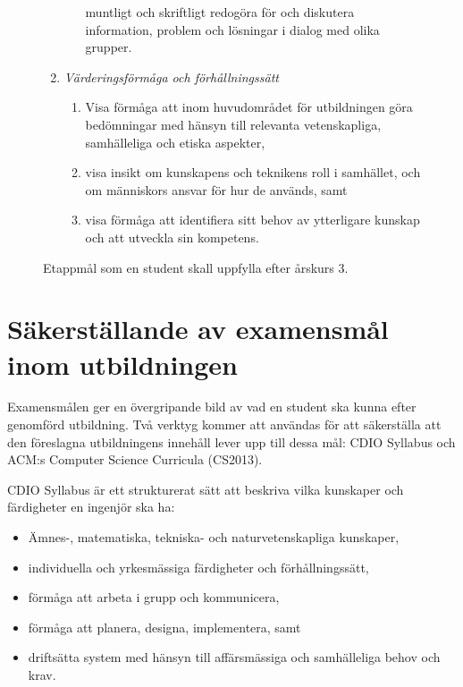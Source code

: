 \begin{figure}[tp]
\begin{tcbframe}
\begin{enumerate}
\begin{enumerate}
    muntligt och skriftligt redogöra för och diskutera information,
    problem och lösningar i dialog med olika grupper.
  \end{enumerate}
\item \emph{Värderingsförmåga och förhållningssätt}
  \begin{enumerate}
  \def\labelenumii{\Alph{enumi}\arabic{enumii}.}
  \tightlist
  \item
    Visa förmåga att inom huvudområdet för utbildningen göra bedömningar
    med hänsyn till relevanta vetenskapliga, samhälleliga och etiska
    aspekter,
  \item
    visa insikt om kunskapens och teknikens roll i samhället, och om
    människors ansvar för hur de används, samt
  \item
    visa förmåga att identifiera sitt behov av ytterligare kunskap och
    att utveckla sin kompetens.
  \end{enumerate}
\end{enumerate}
\end{tcbframe}
\caption{Etappmål som en student skall uppfylla efter årskurs 3.\label{fig:etmal}}
\end{figure}

\section{Säkerställande av examensmål inom utbildningen}

Examensmålen ger en övergripande bild av vad en student ska kunna efter genomförd utbildning. Två verktyg kommer att användas för att säkerställa att den föreslagna utbildningens innehåll lever upp till dessa mål: CDIO Syllabus och ACM:s Computer Science Curricula (CS2013).

CDIO Syllabus är ett strukturerat sätt att beskriva vilka kunskaper och färdigheter en ingenjör ska ha:

\begin{itemize}
\tightlist
\item
  Ämnes-, matematiska, tekniska- och naturvetenskapliga kunskaper,
\item
  individuella och yrkesmässiga färdigheter och förhållningssätt,
\item
  förmåga att arbeta i grupp och kommunicera,
\item
  förmåga att planera, designa, implementera, samt
\item
  driftsätta system med hänsyn till affärsmässiga och samhälleliga behov
  och krav.
\end{itemize}


